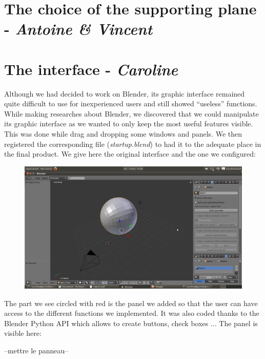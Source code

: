 \documentclass{report}
\begin{document}
\section{The choice of the supporting plane - \textit{Antoine \& Vincent}}

\section{The interface - \textit{Caroline}}

Although we had decided to work on Blender, its graphic interface remained quite difficult to use for inexperienced users and still showed ``useless'' functions. \\
While making researches about Blender, we discovered that we could manipulate its graphic interface as we wanted to only keep the most useful features visible. This was done while drag 	and dropping some windows and panels. We then registered the corresponding file (\textit{startup.blend}) to had it to the adequate place in the final product. We give here the original interface and the one we configured:

\bigskip

\begin{figure}[!h]
\begin{center}
	\includegraphics[scale=0.25]{NotreInterface}
\end{center}
\end{figure}

The part we see circled with red is the panel we added so that the user can have access to the different functions we implemented. It was also coded thanks to the Blender Python API which allows to create buttons, check boxes ... The panel is visible here:

\bigskip
--mettre le panneau--
\bigskip
\end{document}
